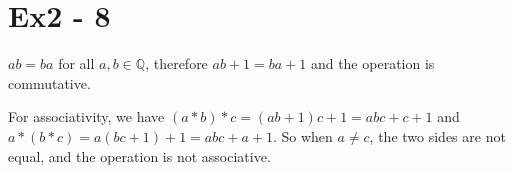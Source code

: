 \section*{Ex2 - 8}
$ ab = ba $ for all $ a, b \in \mathbb{Q} $, therefore $ ab + 1 = ba + 1 $ and the operation is commutative.

For associativity, we have $ (a * b) * c = (ab + 1)c + 1 = abc + c + 1 $ and $ a * (b * c) = a(bc + 1) + 1 = abc + a + 1 $. So when $ a \ne c $, the two sides are not equal, and the operation is not associative.